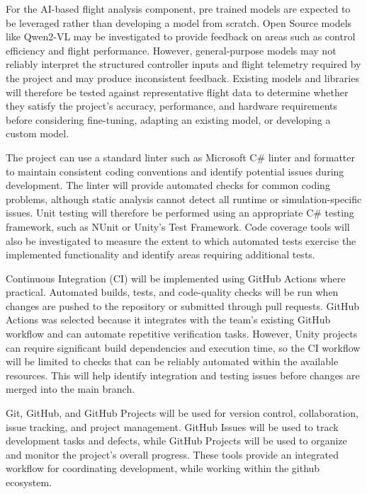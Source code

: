 \documentclass{article}
\begin{document}
\vspace{0.75em}

\noindent For the AI-based flight analysis component, pre trained models are expected to be leveraged rather than developing a model from scratch. Open Source models like Qwen2-VL may be investigated to provide feedback on areas such as control efficiency and flight performance. However, general-purpose models may not reliably interpret the structured controller inputs and flight telemetry required by the project and may produce inconsistent feedback. Existing models and libraries will therefore be tested against representative flight data to determine whether they satisfy the project's accuracy, performance, and hardware requirements before considering fine-tuning, adapting an existing model, or developing a custom model.

\vspace{0.75em}

\noindent The project can use a standard linter such as Microsoft C\# linter and formatter to maintain consistent coding conventions and identify potential issues during development. The linter will provide automated checks for common coding problems, although static analysis cannot detect all runtime or simulation-specific issues. Unit testing will therefore be performed using an appropriate C\# testing framework, such as NUnit or Unity's Test Framework. Code coverage tools will also be investigated to measure the extent to which automated tests exercise the implemented functionality and identify areas requiring additional tests.
\vspace{0.75em}

\noindent Continuous Integration (CI) will be implemented using GitHub Actions where practical. Automated builds, tests, and code-quality checks will be run when changes are pushed to the repository or submitted through pull requests. GitHub Actions was selected because it integrates with the team's existing GitHub workflow and can automate repetitive verification tasks. However, Unity projects can require significant build dependencies and execution time, so the CI workflow will be limited to checks that can be reliably automated within the available resources. This will help identify integration and testing issues before changes are merged into the main branch.

\vspace{0.75em}
\noindent Git, GitHub, and GitHub Projects will be used for version control, collaboration, issue tracking, and project management. GitHub Issues will be used to track development tasks and defects, while GitHub Projects will be used to organize and monitor the project's overall progress. These tools provide an integrated workflow for coordinating development, while working within the github ecosystem.
\end{document}
